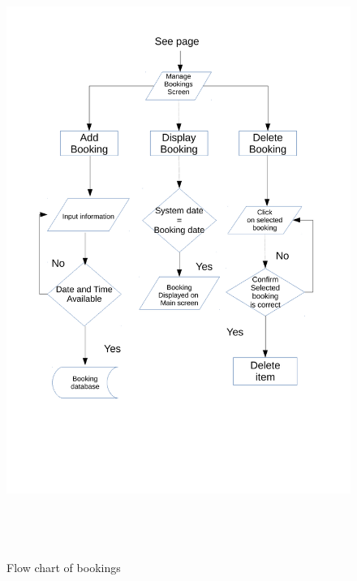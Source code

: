 \begin{figure}[H]
    \includegraphics[height = 20cm]{./Design/Images/flowchart4}
    \caption{Flow chart of bookings} \label{fig:Flowchart4}
\end{figure}

